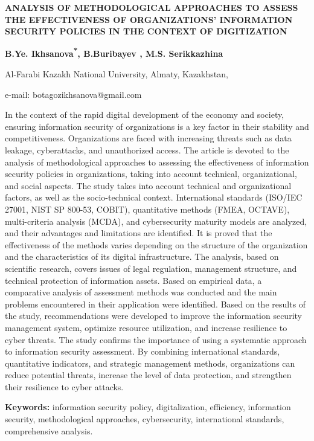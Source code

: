 {\bfseries ANALYSIS OF METHODOLOGICAL APPROACHES TO ASSESS THE
EFFECTIVENESS OF ORGANIZATIONS'{} INFORMATION SECURITY
POLICIES IN THE CONTEXT OF DIGITIZATION}

{\bfseries B.Ye. Ikhsanova\textsuperscript{*}, B.Buribayev , M.S.
Serikkazhina}

Al-Farabi Kazakh National University, Almaty, Kazakhstan,

e-mail: botagozikhsanova@gmail.com

In the context of the rapid digital development of the economy and
society, ensuring information security of organizations is a key factor
in their stability and competitiveness. Organizations are faced with
increasing threats such as data leakage, cyberattacks, and unauthorized
access. The article is devoted to the analysis of methodological
approaches to assessing the effectiveness of information security
policies in organizations, taking into account technical,
organizational, and social aspects. The study takes into account
technical and organizational factors, as well as the socio-technical
context. International standards (ISO/IEC 27001, NIST SP 800-53, COBIT),
quantitative methods (FMEA, OCTAVE), multi-criteria analysis (MCDA), and
cybersecurity maturity models are analyzed, and their advantages and
limitations are identified. It is proved that the effectiveness of the
methods varies depending on the structure of the organization and the
characteristics of its digital infrastructure. The analysis, based on
scientific research, covers issues of legal regulation, management
structure, and technical protection of information assets. Based on
empirical data, a comparative analysis of assessment methods was
conducted and the main problems encountered in their application were
identified. Based on the results of the study, recommendations were
developed to improve the information security management system,
optimize resource utilization, and increase resilience to cyber threats.
The study confirms the importance of using a systematic approach to
information security assessment. By combining international standards,
quantitative indicators, and strategic management methods, organizations
can reduce potential threats, increase the level of data protection, and
strengthen their resilience to cyber attacks.

{\bfseries Keywords:} information security policy, digitalization,
efficiency, information security, methodological approaches,
cybersecurity, international standards, comprehensive analysis.

